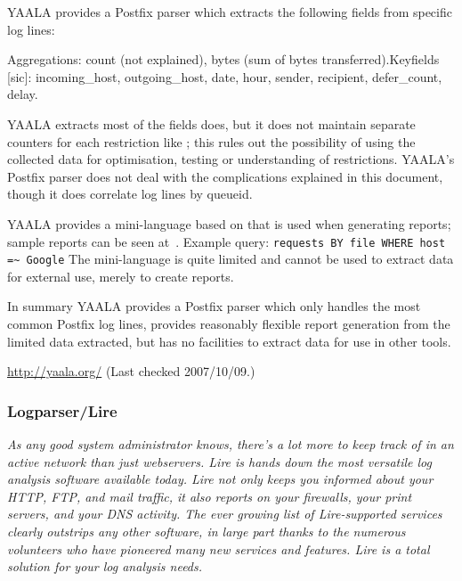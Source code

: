 YAALA provides a Postfix parser which extracts the following fields from
specific log lines:

\noindent\tab{}Aggregations: count (not explained), bytes (sum of bytes
transferred).\newline \tab{}Keyfields [sic]: incoming\_host,
outgoing\_host, date, hour, sender, recipient, defer\_count, delay.

YAALA extracts most of the fields \parsername{} does, but it does not
maintain separate counters for each restriction like \parsername{}; this
rules out the possibility of using the collected data for  optimisation,
testing or understanding of restrictions.  YAALA's Postfix parser does not
deal with the complications explained in this document, though it does
correlate log lines by queueid.

YAALA provides a mini-language based on \SQL{} that is used when generating
reports; sample reports can be seen at~\cite{yaala-samples}.  Example
query: \newline \tab{} \texttt{requests BY file WHERE host =\~{} Google}
\newline The mini-language is quite limited and cannot be used to extract
data for external use, merely to create reports.

In summary YAALA provides a Postfix parser which only handles the most
common Postfix log lines, provides reasonably flexible report generation
from the limited data extracted, but has no facilities to extract data for
use in other tools.

\url{http://yaala.org/} \newline (Last checked 2007/10/09.)

\subsubsection{Logparser/Lire}

\textit{As any good system administrator knows, there's a lot more to keep
track of in an active network than just webservers. Lire is hands down the
most versatile log analysis software available today. Lire not only keeps
you informed about your HTTP, FTP, and mail traffic, it also reports on
your firewalls, your print servers, and your DNS activity. The ever growing
list of Lire-supported services clearly outstrips any other software, in
large part thanks to the numerous volunteers who have pioneered many new
services and features. Lire is a total solution for your log analysis
needs.\/}

